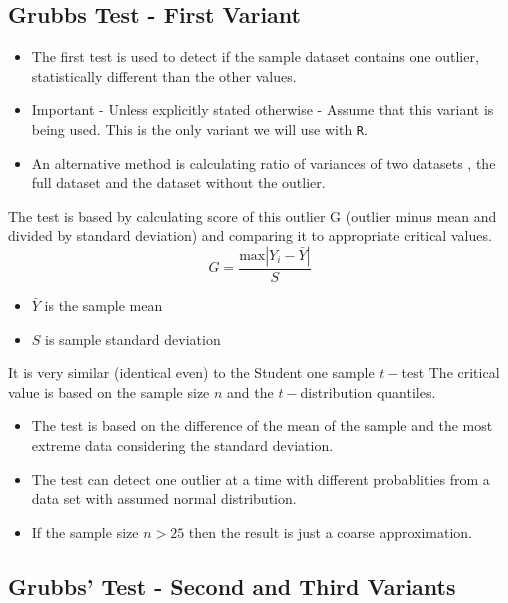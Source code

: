 \documentclass[a4paper,12pt]{article}
\begin{document}
\subsection{Grubbs Test - First Variant}

\begin{itemize}
	\item The first test is used to detect if the sample dataset contains one outlier, statistically different than
	the other values. 
	\item Important - Unless explicitly stated otherwise - Assume that this variant is being used. This is the only variant we will use with \texttt{R}.
	\item  An alternative method is calculating ratio of
	variances of two datasets , the full dataset and the dataset without the outlier.
\end{itemize}

The test is based by calculating score of this outlier G (outlier minus mean and divided
by standard deviation) and comparing it to appropriate critical values.
\[ G = \frac{\mbox{max}|Y_i-\bar{Y}|}{S} \]

\begin{itemize}
	\item $\bar{Y}$ is the sample mean
	\item $S$ is sample standard deviation
\end{itemize}
It is very similar (identical even) to the Student one sample $t-$test
The critical value is based on the sample size $n$ and the $t-$distribution quantiles. 


\begin{itemize}
	\item The test is based on the difference of the mean of the sample and the most
	extreme data considering the standard deviation.
	\item The test can detect one outlier at a time with different probablities from a data set with assumed normal distribution. 
	\item If the sample size $n>25$ then the result is
	just a coarse approximation.
\end{itemize}

\subsection{Grubbs' Test - Second and Third Variants}
\end{document}
